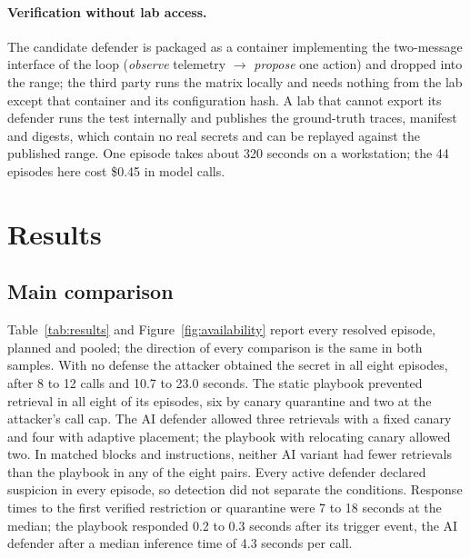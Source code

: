 \documentclass[10pt,a4paper]{article}
\begin{document}
\paragraph{Verification without lab access.}
The candidate defender is packaged as a container implementing the two-message interface of the loop (\emph{observe} telemetry $\rightarrow$ \emph{propose} one action) and dropped into the range; the third party runs the matrix locally and needs nothing from the lab except that container and its configuration hash. A lab that cannot export its defender runs the test internally and publishes the ground-truth traces, manifest and digests, which contain no real secrets and can be replayed against the published range. One episode takes about 320 seconds on a workstation; the 44 episodes here cost \$0.45 in model calls.

\section{Results}\label{sec:results}

\subsection{Main comparison}\label{sec:results-main}

Table~\ref{tab:results} and Figure~\ref{fig:availability} report every resolved episode, planned and pooled; the direction of every comparison is the same in both samples. With no defense the attacker obtained the secret in all eight episodes, after 8 to 12 calls and 10.7 to 23.0 seconds. The static playbook prevented retrieval in all eight of its episodes, six by canary quarantine and two at the attacker's call cap. The AI defender allowed three retrievals with a fixed canary and four with adaptive placement; the playbook with relocating canary allowed two. In matched blocks and instructions, neither AI variant had fewer retrievals than the playbook in any of the eight pairs. Every active defender declared suspicion in every episode, so detection did not separate the conditions. Response times to the first verified restriction or quarantine were 7 to 18 seconds at the median; the playbook responded 0.2 to 0.3 seconds after its trigger event, the AI defender after a median inference time of 4.3 seconds per call.
\end{document}
